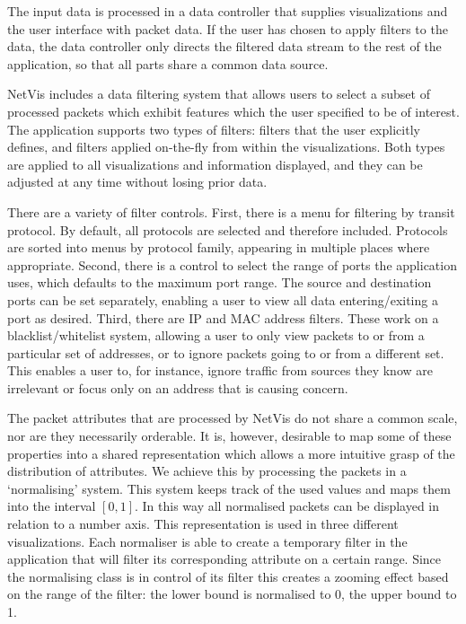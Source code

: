The input data is processed in a data controller that supplies visualizations and the user
interface with packet data. If the user has chosen to apply filters to the data, the data controller
only directs the filtered data stream to the rest of the application, so that all parts share a
common data source.

NetVis includes a data filtering system that allows users to select a subset of processed packets
which exhibit features which the user specified to be of interest. The application supports two
types of filters: filters that the user explicitly defines, and filters applied on-the-fly from
within the visualizations. Both types are applied to all visualizations and information displayed,
and they can be adjusted at any time without losing prior data.

There are a variety of filter controls. First, there is a menu for filtering by transit protocol.
By default, all protocols are selected and therefore included. Protocols are sorted into menus by
protocol family, appearing in multiple places where appropriate. Second, there is a control to
select the range of ports the application uses, which defaults to the maximum port range.  The
source and destination ports can be set separately, enabling a user to view all data
entering/exiting a port as desired.  Third, there are IP and MAC address filters.  These work on a
blacklist/whitelist system, allowing a user to only view packets to or from a particular set of
addresses, or to ignore packets going to or from a different set.  This enables a user to, for
instance, ignore traffic from sources they know are irrelevant or focus only on an address that is
causing concern.

The packet attributes that are processed by NetVis do not share a common scale, nor are they
necessarily orderable. It is, however, desirable to map some of these properties into a shared
representation which allows a more intuitive grasp of the distribution of attributes. We achieve
this by processing the packets in a `normalising' system. This system keeps track of the used values
and maps them into the interval $[0,1]$. In this way all normalised packets can be displayed in
relation to a number axis. This representation is used in three different visualizations. Each
normaliser is able to create a temporary filter in the application that will filter its
corresponding attribute on a certain range. Since the normalising class is in control of its filter
this creates a zooming effect based on the range of the filter: the lower bound is normalised to 0,
the upper bound to 1.

